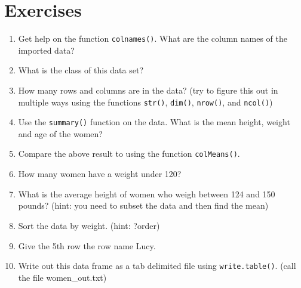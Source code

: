 \documentclass[12pt]{article}\usepackage[]{graphicx}\usepackage[]{color}
\newcommand{\ben}{\begin{enumerate}}
\newcommand{\een}{\end{enumerate}}
\newcommand{\dd}{\item}
\newcommand{\ttt}{\texttt}
\begin{document}

\section*{Exercises}

\ben
  \dd Get help on the function \ttt{colnames()}. What are the column names of 
  the imported data?
  \dd What is the class of this data set?
  \dd How many rows and columns are in the data? (try to figure this out in 
  multiple ways using the functions \ttt{str()}, \ttt{dim()}, \ttt{nrow()}, and 
  \ttt{ncol()})
  \dd Use the \ttt{summary()} function on the data. What is the mean height, 
  weight and age of the women?
  \dd Compare the above result to using the function \ttt{colMeans()}.
  \dd How many women have a weight under 120?
  \dd What is the average height of women who weigh between 124 and 150 pounds? 
  (hint: you need to subset the data and then find the mean)
  \dd Sort the data by weight. (hint: ?order)
  \dd Give the 5th row the row name Lucy.
  \dd Write out this data frame as a tab delimited file using \ttt{write.table()}. 
  (call the file women\_out.txt)
\een


% 
% 
% 


\end{document}
